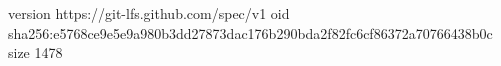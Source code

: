 version https://git-lfs.github.com/spec/v1
oid sha256:e5768ce9e5e9a980b3dd27873dac176b290bda2f82fc6cf86372a70766438b0c
size 1478
